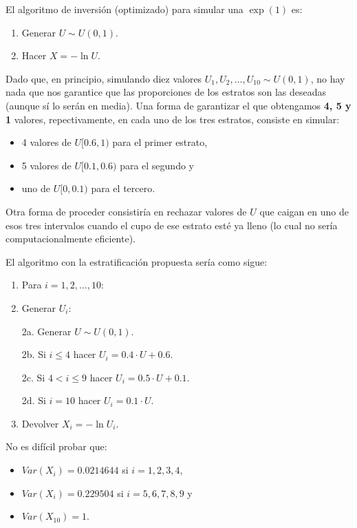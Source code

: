 \documentclass[]{book}
\theoremstyle{definition}
\theoremstyle{definition}
\theoremstyle{definition}
\theoremstyle{remark}
\begin{document}
El algoritmo de inversión (optimizado) para simular una
\(\exp\left(1\right)\) es:

\begin{enumerate}
\def\labelenumi{\arabic{enumi}.}
\item
  Generar \(U\sim U\left( 0,1\right)\).
\item
  Hacer \(X=-\ln U\).
\end{enumerate}

Dado que, en principio, simulando diez valores
\(U_{1},U_{2},\ldots,U_{10}\sim U\left( 0,1\right)\), no hay nada que
nos garantice que las proporciones de los estratos son las deseadas
(aunque sí lo serán en media). Una forma de garantizar el que obtengamos
\textbf{4, 5 y 1} valores, repectivamente, en cada uno de los tres
estratos, consiste en simular:

\begin{itemize}
\item
  4 valores de \(U[0.6,1)\) para el primer estrato,
\item
  5 valores de \(U[0.1,0.6)\) para el segundo y
\item
  uno de \(U[0,0.1)\) para el tercero.
\end{itemize}

Otra forma de proceder consistiría en rechazar valores de \(U\) que
caigan en uno de esos tres intervalos cuando el cupo de ese estrato esté
ya lleno (lo cual no sería computacionalmente eficiente).

El algoritmo con la estratificación propuesta sería como sigue:

\begin{enumerate}
\def\labelenumi{\arabic{enumi}.}
\item
  Para \(i=1,2,\ldots, 10\):
\item
  Generar \(U_{i}\):

  2a. Generar \(U\sim U\left( 0,1\right)\).

  2b. Si \(i\leq4\) hacer \(U_{i} = 0.4 \cdot U + 0.6\).

  2c. Si \(4<i\leq9\) hacer \(U_{i} = 0.5 \cdot U + 0.1\).

  2d. Si \(i=10\) hacer \(U_{i} = 0.1 \cdot U\).
\item
  Devolver \(X_{i}=-\ln U_{i}\).
\end{enumerate}

No es difícil probar que:

\begin{itemize}
\item
  \(Var\left( X_{i}\right) = 0.0214644\) si \(i=1,2,3,4\),
\item
  \(Var\left( X_{i}\right) = 0.229504\) si \(i=5,6,7,8,9\) y
\item
  \(Var\left( X_{10}\right) = 1\).
\end{itemize}
\end{document}
